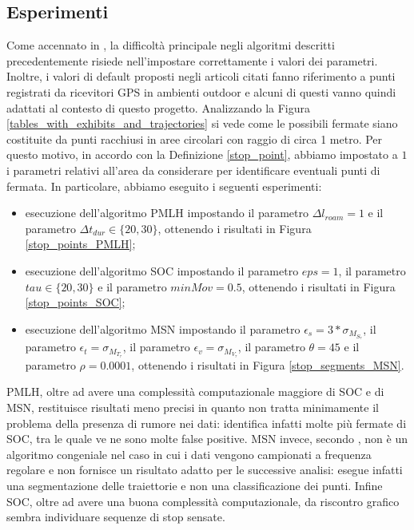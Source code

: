 \documentclass[12pt]{article}
\begin{document}
\newpage
\subsection{Esperimenti}
Come accennato in \cite{ReviewMethods}, la difficoltà principale negli algoritmi descritti precedentemente risiede nell'impostare correttamente i valori dei parametri.
Inoltre, i valori di default proposti negli articoli citati fanno riferimento a punti registrati da ricevitori GPS in ambienti outdoor e alcuni di questi vanno quindi adattati al contesto di questo progetto.
Analizzando la Figura \ref{tables_with_exhibits_and_trajectories} si vede come le possibili fermate siano costituite da punti racchiusi in aree circolari con raggio di circa 1 metro.
Per questo motivo, in accordo con la Definizione \ref{stop_point}, abbiamo impostato a $1$ i parametri relativi all'area da considerare per identificare eventuali punti di fermata.
In particolare, abbiamo eseguito i seguenti esperimenti:
\begin{itemize}
    \item esecuzione dell'algoritmo PMLH impostando il parametro $\Delta l_{roam}=1$ e il parametro $\Delta t_{dur} \in \{20,30\}$, ottenendo i risultati in Figura \ref{stop_points_PMLH};
    \item esecuzione dell'algoritmo SOC impostando il parametro $eps=1$, il parametro $tau \in \{20,30\}$ e il parametro $minMov = 0.5$, ottenendo i risultati in Figura \ref{stop_points_SOC};
    \item esecuzione dell'algoritmo MSN impostando il parametro $\epsilon_s = 3*\sigma_{M_{S_\tau}}$, il parametro $\epsilon_t = \sigma_{M_{T_\tau}}$,  il parametro $\epsilon_v = \sigma_{M_{V_\tau}}$, il parametro $\theta=45$ e il parametro $\rho=0.0001$, ottenendo i risultati in Figura \ref{stop_segments_MSN}.
\end{itemize}
PMLH, oltre ad avere una complessità computazionale maggiore di SOC e di MSN, restituisce risultati meno precisi in quanto non tratta minimamente il problema della presenza di rumore nei dati: identifica infatti molte più fermate di SOC, tra le quale ve ne sono molte false positive.
MSN invece, secondo \cite{Statistical}, non è un algoritmo congeniale nel caso in cui i dati vengono campionati a frequenza regolare e non fornisce un risultato adatto per le successive analisi: esegue infatti una segmentazione delle traiettorie e non una classificazione dei punti.
Infine SOC, oltre ad avere una buona complessità computazionale, da riscontro grafico sembra individuare sequenze di stop sensate.
\end{document}
